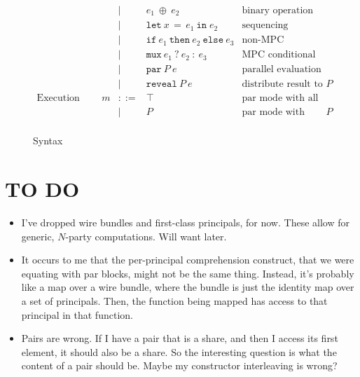 \documentclass[10pt]{article}
\newcommand{\kw}[1]{\ensuremath{\mathtt{#1}}}
\newcommand{\isec}{\ensuremath{\mathtt{pmap}}}
\newcommand{\ebinop}[2]{\ensuremath{{#1}~\oplus~{#2}}}
\newcommand{\elet}[3]{\ensuremath{\kw{let}~#1\, =\, #2~\kw{in}\;{#3}}}
\newcommand{\epar}[2]{\ensuremath{\kw{par}~{#1}~{#2}}}
\newcommand{\esec}[2]{\ensuremath{\kw{sec}~{#1}~{#2}}}
\newcommand{\ereveal}[2]{\ensuremath{\kw{reveal}~{#1}~{#2}}}
\newcommand{\econd}[3]{\ensuremath{\kw{if}~{#1}~\kw{then}~{#2}~\kw{else}~{#3}}}
\newcommand{\emux}[3]{\ensuremath{\kw{mux}~{#1}~\kw{?}~{#2}~\kw{:}~{#3}}}
\newcommand{\esharemap}[3]{\ensuremath{\kw{sharemap}_{#1}~{#2}~{#3}}}
\begin{document}
\begin{figure}[h]
\[\begin{array}{rlcll}
                       && \mid & \ebinop{e_1}{e_2}  & \text{binary operation} \\
                       && \mid & \elet{x}{e_1}{e_2}  & \text{sequencing} \\
                       && \mid & \econd{e_1}{e_2}{e_3}  & \text{non-MPC conditional} \\
                       && \mid & \emux{e_1}{e_2}{e_3}  & \text{MPC conditional} \\
                       && \mid & \epar{P}{e} & \text{parallel evaluation}\\
                       && \mid & \ereveal{P}{e} & \text{distribute result to $P$}\\
    \text{Execution modes} & m  & ::=  & \top & \text{par mode with all principals}\\
                 && \mid & P & \text{par mode with principals $P$} \\      
  \end{array}
  \]
  \caption{Syntax}
  \label{fig:syntax}
\end{figure}

\section{TO DO}

\begin{itemize}
\item I've dropped wire bundles and first-class principals, for
  now. These allow for generic, $N$-party computations. Will want
  later.
\item It occurs to me that the per-principal comprehension
  construct, that we were equating with par blocks, might not be the
  same thing. Instead, it's probably like a map over a wire bundle,
  where the bundle is just the identity map over a set of
  principals. Then, the function being mapped has access to that
  principal in that function.
\item Pairs are wrong. If I have a pair that is a share, and then I
  access its first element, it should also be a share. So the
  interesting question is what the content of a pair should be. Maybe
  my constructor interleaving is wrong?
\end{itemize}
\end{document}

